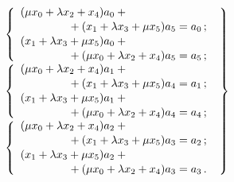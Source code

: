 \begin{multicols}{2}
  \noindent
  \begin{equation}
  \left.
  \begin{array}{l}
    \left\{
\begin{array}{l}
    (\mu x_0+\lambda x_2+x_4)a_0+{}\\[1pt]
    \hspace*{15mm}{}+(x_1+\lambda x_3+\mu x_5)a_5=a_0\,;\\[1pt]
  (x_1+\lambda x_3+\mu x_5)a_0 +{}\\[1pt]
   \hspace*{15mm}{}+(\mu x_0+\lambda x_2+x_4)a_5=a_5\,;
  \end{array}
  \right.\\[9pt]
  \left\{
  \begin{array}{l}
  (\mu x_0+\lambda x_2+x_4)a_1+{}\\[1pt]
  \hspace*{15mm}{}+(x_1+\lambda x_3+\mu x_5)a_4=a_1\,;\\[1pt]
 (x_1+\lambda x_3 +\mu x_5)a_1+{}\\[1pt]
  \hspace*{15mm}{}+(\mu x_0+\lambda x_2 +x_4)a_4=a_4\,;
  \end{array}
  \right.\\[9pt]
  \left\{ 
  \begin{array}{l}
(\mu x_0+\lambda x_2 +x_4)a_2+{}\\[1pt]
 \hspace*{15mm} {}+(x_1+\lambda x_3+\mu x_5)a_3=a_2\,;\\[1pt]
  (x_1+\lambda x_3+\mu x_5)a_2+{}\\[1pt]
   \hspace*{15mm}{}+(\mu x_0+\lambda x_2+x_4)a_3=a_3\,.
    \end{array}
  \right.
\end{array}
  \right\}
  \label{e14-f}
  \end{equation}
  

\end{multicols}

